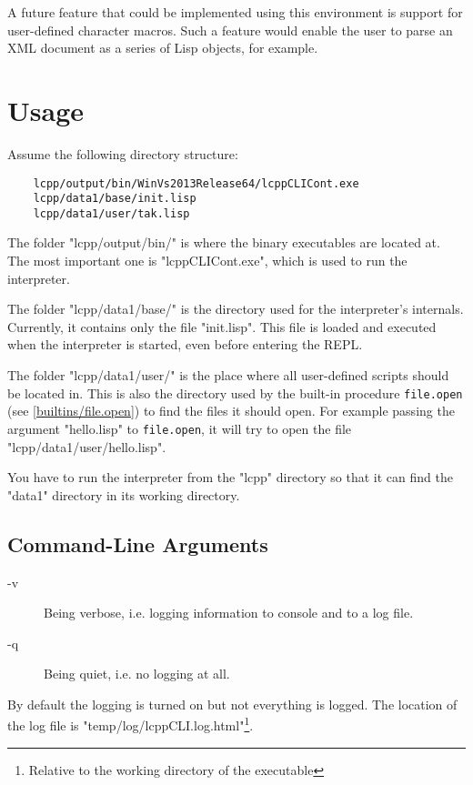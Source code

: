 \documentclass[a4paper]{scrartcl}
\newcommand{\lisp}{Lisp}
\begin{document}
	A future feature that could be implemented using this environment is support for user-defined character macros. Such a feature would enable the user to parse an XML document as a series of \lisp{} objects, for example.

\section{Usage}
\label{usage}
	Assume the following directory structure:
	\begin{lstlisting}
	lcpp/output/bin/WinVs2013Release64/lcppCLICont.exe
	lcpp/data1/base/init.lisp
	lcpp/data1/user/tak.lisp
	\end{lstlisting}

	The folder "lcpp/output/bin/" is where the binary executables are located at. The most important one is "lcppCLICont.exe", which is used to run the interpreter.

	The folder "lcpp/data1/base/" is the directory used for the interpreter's internals. Currently, it contains only the file "init.lisp". This file is loaded and executed when the interpreter is started, even before entering the REPL.

	The folder "lcpp/data1/user/" is the place where all user-defined scripts should be located in. This is also the directory used by the built-in procedure \lstinline|file.open| (see \ref{builtins/file.open}) to find the files it should open. For example passing the argument "hello.lisp" to \lstinline|file.open|, it will try to open the file "lcpp/data1/user/hello.lisp".

	You have to run the interpreter from the "lcpp" directory so that it can find the "data1" directory in its working directory.

\subsection{Command-Line Arguments}
\label{usage/cmd-args}
	\begin{description}
		\item[-v] Being verbose, i.e. logging information to console and to a log file.
		\item[-q] Being quiet, i.e. no logging at all.
	\end{description}
	By default the logging is turned on but not everything is logged. The location of the log file is "temp/log/lcppCLI.log.html"\footnote{Relative to the working directory of the executable}.
\end{document}
